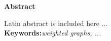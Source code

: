 \begin{latin}
\onecolumn{}
\begin{latinabstract}
\clearpage
\begin{center}
{\textbf{Abstract}} \\[1cm]
\begin{minipage}{0.8\textwidth}
\thispagestyle{plain}
\begin{singlespace}
Latin abstract is included here ...\\
\textbf{Keywords:}{\it weighted graphs, ...}
\end{singlespace}
\end{minipage}
\end{center}
\end{latinabstract}
\end{latin}